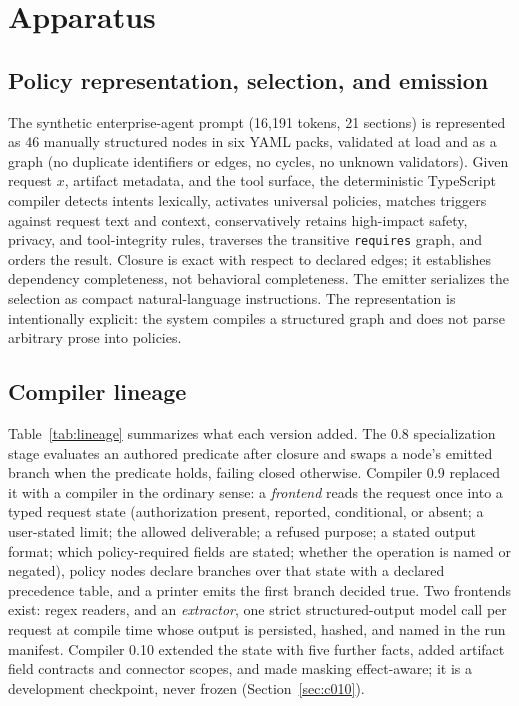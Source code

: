 \documentclass[11pt]{article}
\begin{document}
\section{Apparatus}
\label{sec:apparatus}

\subsection{Policy representation, selection, and emission}

The synthetic enterprise-agent prompt (16{,}191 tokens, 21 sections) is represented as 46 manually structured nodes in six YAML packs, validated at load and as a graph (no duplicate identifiers or edges, no cycles, no unknown validators). Given request $x$, artifact metadata, and the tool surface, the deterministic TypeScript compiler detects intents lexically, activates universal policies, matches triggers against request text and context, conservatively retains high-impact safety, privacy, and tool-integrity rules, traverses the transitive \texttt{requires} graph, and orders the result. Closure is exact with respect to declared edges; it establishes dependency completeness, not behavioral completeness. The emitter serializes the selection as compact natural-language instructions. The representation is intentionally explicit: the system compiles a structured graph and does not parse arbitrary prose into policies.

\subsection{Compiler lineage}
\label{sec:lineage}

Table~\ref{tab:lineage} summarizes what each version added. The 0.8 specialization stage evaluates an authored predicate after closure and swaps a node's emitted branch when the predicate holds, failing closed otherwise. Compiler 0.9 replaced it with a compiler in the ordinary sense: a \emph{frontend} reads the request once into a typed request state (authorization present, reported, conditional, or absent; a user-stated limit; the allowed deliverable; a refused purpose; a stated output format; which policy-required fields are stated; whether the operation is named or negated), policy nodes declare branches over that state with a declared precedence table, and a printer emits the first branch decided true. Two frontends exist: regex readers, and an \emph{extractor}, one strict structured-output model call per request at compile time whose output is persisted, hashed, and named in the run manifest. Compiler 0.10 extended the state with five further facts, added artifact field contracts and connector scopes, and made masking effect-aware; it is a development checkpoint, never frozen (Section~\ref{sec:c010}).
\end{document}
